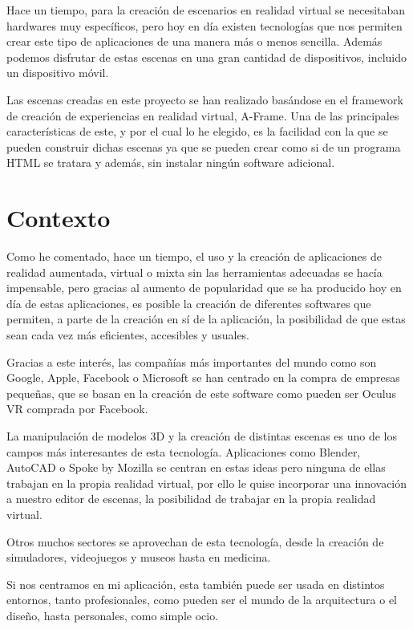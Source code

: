 \documentclass[a4paper, 12pt]{book}
\begin{document}
Hace un tiempo, para la creación de escenarios en realidad virtual se necesitaban hardwares muy específicos, pero hoy en día existen tecnologías que nos permiten crear este tipo de aplicaciones de una manera más o menos sencilla. Además podemos disfrutar de estas escenas en una gran cantidad de dispositivos, incluido un dispositivo móvil.

Las escenas creadas en este proyecto se han realizado basándose en el framework de creación de experiencias en realidad virtual, A-Frame. Una de las principales características de este, y por el cual lo he elegido, es la facilidad con la que se pueden construir dichas escenas ya que se pueden crear como si de un programa HTML se tratara y además, sin instalar ningún software adicional.

\section{Contexto}
\label{sec:contexto}

Como he comentado, hace un tiempo, el uso y la creación de aplicaciones de realidad aumentada, virtual o mixta sin las herramientas adecuadas se hacía impensable, pero gracias al aumento de popularidad que se ha producido hoy en día de estas aplicaciones, es posible la creación de diferentes softwares que permiten, a parte de la creación en sí de la aplicación, la posibilidad de que estas sean cada vez más eficientes, accesibles y usuales.

Gracias a este interés, las compañías más importantes del mundo como son Google, Apple, Facebook o Microsoft se han centrado en la compra de empresas pequeñas, que se basan en la creación de este software como pueden ser Oculus VR comprada por Facebook. 

La manipulación de modelos 3D y la creación de distintas escenas es uno de los campos más interesantes de esta tecnología. Aplicaciones como Blender, AutoCAD o Spoke by Mozilla se centran en estas ideas pero ninguna de ellas trabajan en la propia realidad virtual, por ello le quise incorporar una innovación a nuestro editor de escenas, la posibilidad de trabajar en la propia realidad virtual.

Otros muchos sectores se aprovechan de esta tecnología, desde la creación de  simuladores, videojuegos y museos hasta en medicina.

Si nos centramos en mi aplicación, esta también puede ser usada en distintos entornos, tanto profesionales, como pueden ser el mundo de la arquitectura o el diseño, hasta personales, como simple ocio.
\end{document}

